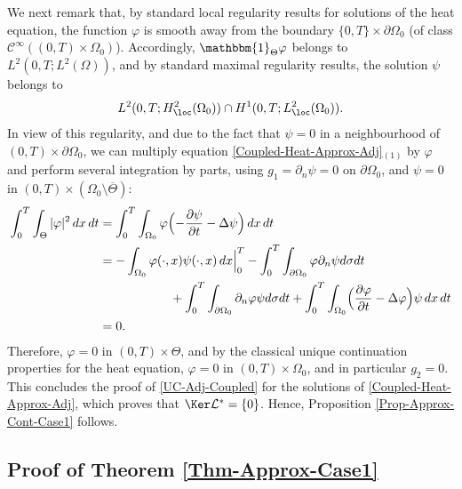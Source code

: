We next remark that, by standard local regularity results for solutions of the heat equation, the function $\varphi$ is smooth away from the boundary $\{0,T\}\times\partial \Omega_0$ (of class $\mathscr{C}^\infty((0,T) \times \Omega_0)$). Accordingly, $\mathbbm{1}_{\Theta}\varphi $ belongs to $L^2(0,T; L^2(\Omega))$, and by standard maximal regularity results, the solution $\psi$ belongs to
\[
L^2(0,T; H^2_{\loc}(\Omega_0)) \cap H^1(0,T; L^2_{\loc}(\Omega_0)).
\]
In view of this regularity, and due to the fact that $\psi = 0$ in a neighbourhood of $(0,T) \times \partial \Omega_0$, we can multiply equation \eqref{Coupled-Heat-Approx-Adj}$_{(1)}$ by $\varphi$ and perform several integration by parts, using $g_1 = \partial_n\psi =0$ on $\partial\Omega_0$, and $\psi = 0$ in $(0,T) \times (\Omega_0 \setminus \overline{\Theta})$:
\begin{align*}
\int_0^T \int_{\Theta} |\varphi|^2 \, dx\,dt
&=
\int_0^T \int_{\Omega_0} \varphi \Bigl(- \dfrac{\partial \psi}{\partial t}-\Delta \psi\Bigr) \, dx\,dt
\\
&=
- \int_{\Omega_0} \varphi(\cdot,x) \psi(\cdot, x)\, dx\Big|_0^T
-\int_0^T \int_{\partial\Omega_0} \varphi \partial_n \psi d\sigma dt\\
&\hspace*{2cm}+
\int_0^T \int_{\partial\Omega_0} \partial_n \varphi \psi d\sigma dt
+\int_0^T \int_{\Omega_0} \Bigl(\dfrac{\partial \varphi}{\partial t}-\Delta \varphi \Bigr) \psi \, dx\,dt\\
&=0.
\end{align*}
Therefore, $\varphi = 0$ in $(0,T) \times \Theta$, and by the classical unique continuation properties for the heat equation, $\varphi = 0$ in $(0,T) \times \Omega_0$, and in particular $g_2 = 0$. This concludes the proof of \eqref{UC-Adj-Coupled} for the solutions of \eqref{Coupled-Heat-Approx-Adj}, which proves that $\Ker\mathcal{L}^* = \{0\}$. Hence, Proposition \ref{Prop-Approx-Cont-Case1} follows.

\subsection{Proof of Theorem \ref{Thm-Approx-Case1}}\label{Subsec-Proof-Approx-Case1}

